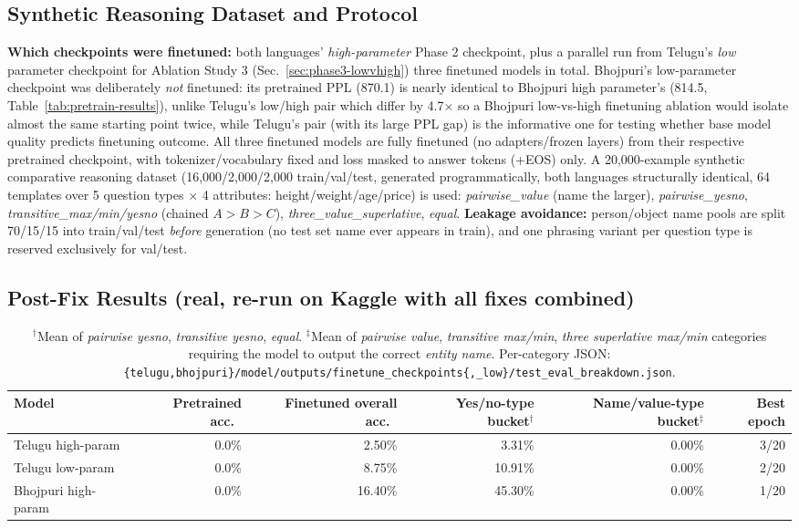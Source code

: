 \documentclass[10pt,a4paper]{article}
\begin{document}
\subsection{Synthetic Reasoning Dataset and Protocol}
\textbf{Which checkpoints were finetuned:} both languages' \emph{high-parameter} Phase 2
checkpoint, plus a parallel run from Telugu's \emph{low} parameter checkpoint for Ablation
Study 3 (Sec.~\ref{sec:phase3-lowvhigh}) three finetuned models in total.
Bhojpuri's low-parameter checkpoint was deliberately \emph{not} finetuned: its pretrained PPL
(870.1) is nearly identical to Bhojpuri high parameter's (814.5, Table~\ref{tab:pretrain-results}),
unlike Telugu's low/high pair which differ by 4.7$\times$ so a Bhojpuri low-vs-high finetuning
ablation would isolate almost the same starting point twice, while Telugu's pair (with its large
PPL gap) is the informative one for testing whether base model quality predicts finetuning
outcome. All three finetuned models are fully finetuned (no adapters/frozen layers) from their
respective pretrained checkpoint, with tokenizer/vocabulary fixed and loss masked to answer
tokens (+EOS) only. A 20,000-example
synthetic comparative reasoning dataset (16,000/2,000/2,000 train/val/test, generated
programmatically, both languages structurally identical, 64 templates over 5 question types
$\times$ 4 attributes: height/weight/age/price) is used: \emph{pairwise\_value} (name the
larger), \emph{pairwise\_yesno}, \emph{transitive\_max/min/yesno} (chained $A{>}B{>}C$),
\emph{three\_value\_superlative}, \emph{equal}. \textbf{Leakage avoidance:} person/object name
pools are split 70/15/15 into train/val/test \emph{before} generation (no test set name ever
appears in train), and one phrasing variant per question type is reserved exclusively for
val/test.

\subsection{Post-Fix Results (real, re-run on Kaggle with all fixes combined)}
\begin{table}[H]\centering\footnotesize
\begin{tabular}{lrrrrr}
\toprule
Model & Pretrained acc.\ & Finetuned overall acc.\ & Yes/no-type bucket$^\dagger$ & Name/value-type bucket$^\ddagger$ & Best epoch \\
\midrule
Telugu high-param   & 0.0\% & 2.50\%  & 3.31\%  & 0.00\% & 3/20 \\
Telugu low-param     & 0.0\% & 8.75\%  & 10.91\% & 0.00\% & 2/20 \\
Bhojpuri high-param & 0.0\% & 16.40\% & 45.30\% & 0.00\% & 1/20 \\
\bottomrule
\end{tabular}
\caption{$^\dagger$Mean of \emph{pairwise yesno}, \emph{transitive yesno}, \emph{equal}.
$^\ddagger$Mean of \emph{pairwise value}, \emph{transitive max/min},
\emph{three superlative max/min} categories requiring the model to output the correct
\emph{entity name}. Per-category JSON: \texttt{\{telugu,bhojpuri\}/model/outputs/finetune\_\allowbreak checkpoints\{,\_low\}/test\_eval\_breakdown.json}.}
\label{tab:finetune-results}
\end{table}
\vspace{-8pt}
\end{document}

